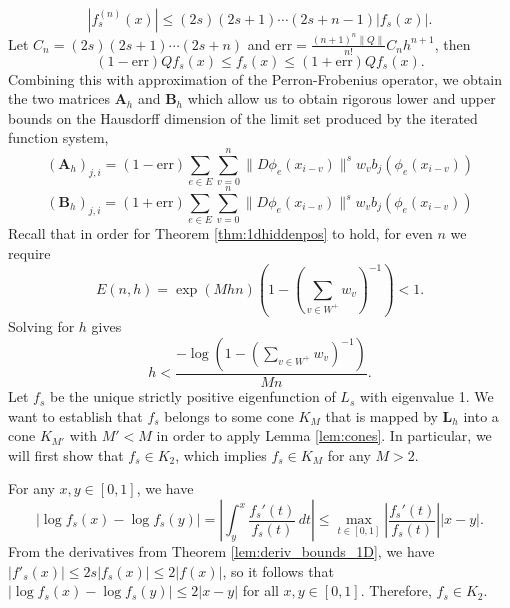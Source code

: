 \documentclass[10pt]{article}
\theoremstyle{definition}
\numberwithin{equation}{section}
\numberwithin{figure}{section}
\numberwithin{table}{section}
\begin{document}
$$|f_s^{(n)}(x)|\leq (2s)(2s+1)\cdots(2s+n-1)|f_s(x)|.$$
Let $C_n=(2s)(2s+1)\cdots(2s+n)$ and $\mathrm{err}=\frac{(n+1)^n\|Q\|}{n!}C_nh^{n+1}$, then
$$(1-\mathrm{err})Qf_s(x)\leq f_s(x)\leq (1+\mathrm{err})Qf_s(x).$$
Combining this with approximation of the Perron-Frobenius operator, we obtain the two matrices $\mathbf{A}_h$ and $\mathbf{B}_h$ which allow us to obtain rigorous lower and upper bounds on the Hausdorff dimension of the limit set produced by the iterated function system,
$$(\mathbf{A}_h)_{j,i}=(1-\mathrm{err})\sum_{e\in E}\sum_{v=0}^n\|D\phi_e(x_{i-v})\|^sw_vb_j(\phi_e(x_{i-v}))$$
$$(\mathbf{B}_h)_{j,i}=(1+\mathrm{err})\sum_{e\in E}\sum_{v=0}^n\|D\phi_e(x_{i-v})\|^sw_vb_j(\phi_e(x_{i-v}))$$
Recall that in order for Theorem \ref{thm:1dhiddenpos} to hold, for even $n$ we require
$$E(n,h)=\exp(Mhn)\left(1-\left(\sum_{v\in W^+}w_v\right)^{-1}\right)<1.$$
Solving for $h$ gives
\begin{equation}
h<\frac{-\log\left(1-\left(\sum_{v\in W^+}w_v\right)^{-1}\right)}{Mn}.
\label{eq:M_cond1D}
\end{equation}
Let $f_s$ be the unique strictly positive eigenfunction of $L_s$ with eigenvalue 1. We want to establish that $f_s$ belongs to some cone $K_M$ that is mapped by $\mathbf{L}_h$ into a cone $K_{M'}$ with $M'<M$ in order to apply Lemma \ref{lem:cones}. In particular, we will first show that $f_s\in K_2$, which implies $f_s\in K_M$ for any $M>2$.

For any $x,y\in[0,1]$, we have 
$$|\log f_s(x)-\log f_s(y)|=\left|\int_y^x\frac{f_s'(t)}{f_s(t)}\,dt\right|\leq\max_{t\in[0,1]}\left|\frac{f_s'(t)}{f_s(t)}\right||x-y|.$$
From the derivatives from Theorem \ref{lem:deriv_bounds_1D}, we have $|f'_s(x)|\leq 2s|f_s(x)|\leq 2|f(x)|$, so it follows that $|\log f_s(x)-\log f_s(y)|\leq 2|x-y|$ for all $x,y\in[0,1]$. Therefore, $f_s\in K_2$.
\end{document}
